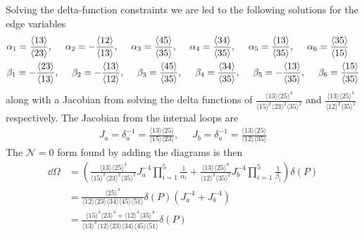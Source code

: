 \documentclass[letter,11pt]{article}
\newcommand{\ab}[1]{\langle #1 \rangle}
\begin{document}
Solving the delta-function constraints we are led to the following solutions for the edge variables
\begin{equation}
	\begin{aligned}
		&\alpha_1=\frac{\expval{13}}{\expval{23}},~~~~
		\alpha_2=-\frac{\expval{12}}{\expval{13}},~~~~
		\alpha_3=\frac{\expval{45}}{\expval{35}},~~~~
		\alpha_4=\frac{\expval{34}}{\expval{35}},~~~~
		\alpha_5=\frac{\expval{13}}{\expval{35}},~~~~
		\alpha_6=\frac{\expval{35}}{\expval{15}}\\
	&\beta_1=-\frac{\expval{23}}{\expval{13}},~~~~
	\beta_2=-\frac{\expval{13}}{\expval{12}},~~~~
	\beta_3=\frac{\expval{45}}{\expval{35}},~~~~
	\beta_4=\frac{\expval{34}}{\expval{35}},~~~~
	\beta_5=-\frac{\expval{13}}{\expval{35}},~~~~
	\beta_6=\frac{\expval{15}}{\expval{35}}
	\end{aligned}
\end{equation}
along with a Jacobian from solving the delta functions of $\frac{\ab{13}\ab{25}^4}{\ab{15}^2\ab{23}^2\ab{35}^2}$ and $\frac{\ab{13}\ab{25}^4}{\ab{12}^2\ab{35}^2}$ respectively. The Jacobian from the internal loops are
\begin{equation}
	\begin{aligned}
		J_a=\delta_a^{-1}=\frac{\ab{13}\ab{25}}{\ab{15}\ab{23}},~~~~~~J_b=\delta_a^{-1}=\frac{\ab{13}\ab{25}}{\ab{12}\ab{35}}
	\end{aligned}
\end{equation}
The $\mathcal{N}=0$ form found by adding the diagrams is then
\begin{equation}
	\begin{aligned}
		\dd\Omega
		&=\left(\frac{\ab{13}\ab{25}^4}{\ab{15}^2\ab{23}^2\ab{35}^2}J_a^{-4}\prod_{i=1}^{5}\frac{1}{\alpha_i}+\frac{\ab{13}\ab{25}^4}{\ab{12}^2\ab{35}^2}J_b^{-4}\prod_{i=1}^{5}\frac{1}{\beta_i}\right)\delta(P)\\
		&=\frac{\ab{25}^4}{\ab{12}\ab{23}\ab{34}\ab{45}\ab{51}}\delta(P)\left(J_a^{-4}+J_b^{-4}\right)\\
		&=\frac{\ab{15}^4\ab{23}^4+\ab{12}^4\ab{35}^4}{\ab{13}^4\ab{12}\ab{23}\ab{34}\ab{45}\ab{51}}\delta(P)
	\end{aligned}
\end{equation}
\end{document}

